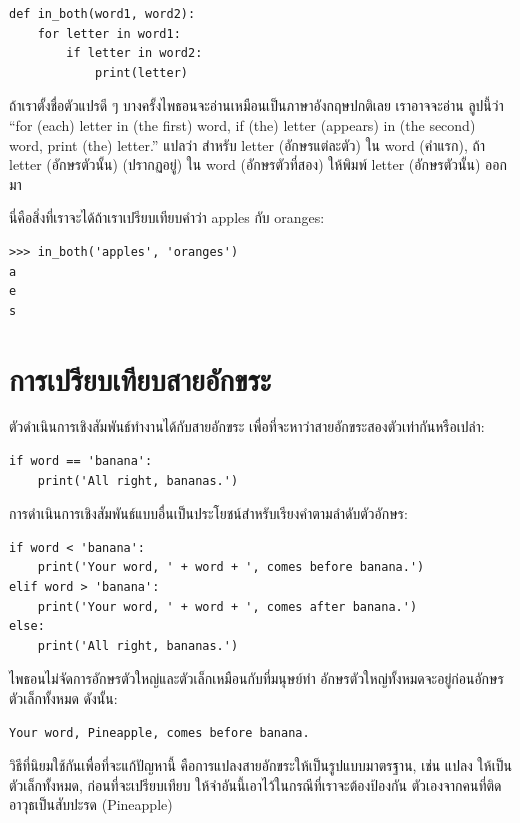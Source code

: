 \begin{verbatim}
def in_both(word1, word2):
    for letter in word1:
        if letter in word2:
            print(letter)
\end{verbatim}
%
ถ้าเราตั้งชื่อตัวแปรดี ๆ บางครั้งไพธอนจะอ่านเหมือนเป็นภาษาอังกฤษปกติเลย เราอาจจะอ่าน
ลูปนี้ว่า ``for (each) letter in (the first) word, if (the) letter 
(appears) in (the second) word, print (the) letter.'' แปลว่า สำหรับ
letter (อักษรแต่ละตัว) ใน word (คำแรก), ถ้า letter (อักษรตัวนั้น) (ปรากฏอยู่) ใน word 
(อักษรตัวที่สอง) ให้พิมพ์ letter (อักษรตัวนั้น) ออกมา

นี่คือสิ่งที่เราจะได้ถ้าเราเปรียบเทียบคำว่า apples กับ oranges:

\begin{verbatim}
>>> in_both('apples', 'oranges')
a
e
s
\end{verbatim}
%

\section{การเปรียบเทียบสายอักขระ} %

ตัวดำเนินการเชิงสัมพันธ์ทำงานได้กับสายอักขระ เพื่อที่จะหาว่าสายอักขระสองตัวเท่ากันหรือเปล่า:

\begin{verbatim}
if word == 'banana':
    print('All right, bananas.')
\end{verbatim}
%
การดำเนินการเชิงสัมพันธ์แบบอื่นเป็นประโยชน์สำหรับเรียงคำตามลำดับตัวอักษร:

\begin{verbatim}
if word < 'banana':
    print('Your word, ' + word + ', comes before banana.')
elif word > 'banana':
    print('Your word, ' + word + ', comes after banana.')
else:
    print('All right, bananas.')
\end{verbatim}
%
ไพธอนไม่จัดการอักษรตัวใหญ่และตัวเล็กเหมือนกับที่มนุษย์ทำ อักษรตัวใหญ่ทั้งหมดจะอยู่ก่อนอักษร
ตัวเล็กทั้งหมด ดังนั้น:

\begin{verbatim}
Your word, Pineapple, comes before banana.
\end{verbatim}
%
วิธีที่นิยมใช้กันเพื่อที่จะแก้ปัญหานี้ คือการแปลงสายอักขระให้เป็นรูปแบบมาตรฐาน, เช่น แปลง
ให้เป็นตัวเล็กทั้งหมด, ก่อนที่จะเปรียบเทียบ ให้จำอันนี้เอาไว้ในกรณีที่เราจะต้องป้องกัน
ตัวเองจากคนที่ติดอาวุธเป็นสับปะรด (Pineapple)


